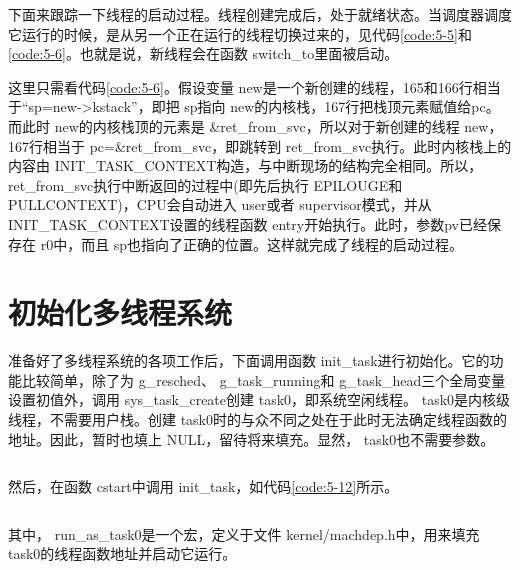 \documentclass[main.tex]{subfiles}
\begin{document}
\begin{CJK*}{UTF8}{song}
\par
下面来跟踪一下线程的启动过程。线程创建完成后，处于就绪状态。当调度器调度它运行的时候，是从另一个正在运行的线程切换过来的，见代码\ref{code:5-5}和\ref{code:5-6}。也就是说，新线程会在函数 switch\_\-to里面被启动。

\par
这里只需看代码\ref{code:5-6}。假设变量 new是一个新创建的线程，165和166行相当于“sp=new-\textgreater kstack”，即把 sp指向 new的内核栈，167行把栈顶元素赋值给pc。而此时 new的内核栈顶的元素是  \&ret\_\-from\_\-svc，所以对于新创建的线程 new，167行相当于 pc=\&ret\_\-from\_\-svc，即跳转到 ret\_\-from\_\-svc执行。此时内核栈上的内容由  INIT\_\-TASK\_\-CONTEXT构造，与中断现场的结构完全相同。所以，  ret\_\-from\_\-svc执行中断返回的过程中(即先后执行 EPILOUGE和  PULL\-CONTEXT)，CPU会自动进入 user或者 supervisor模式，并从  INIT\_\-TASK\_\-CONTEXT设置的线程函数  entry开始执行。此时，参数pv已经保存在 r0中，而且 sp也指向了正确的位置。这样就完成了线程的启动过程。

\section{初始化多线程系统}
准备好了多线程系统的各项工作后，下面调用函数 init\_\-task进行初始化。它的功能比较简单，除了为 g\_\-resched、 g\_\-task\_\-running和 g\_\-task\_\-head三个全局变量设置初值外，调用 sys\_\-task\_\-create创建 task0，即系统空闲线程。 task0是内核级线程，不需要用户栈。创建 task0时的与众不同之处在于此时无法确定线程函数的地址。因此，暂时也填上 NULL，留待将来填充。显然， task0也不需要参数。

\begin{code}
\label{code:5-11}
\inputminted[firstline=290,lastline=306,linenos,numbersep=5pt,frame=lines,framesep=2mm]{c}{src/chapter05/kernel/task.c}
\end{code}

\noindent
然后，在函数 cstart中调用 init\_\-task，如代码\ref{code:5-12}所示。

\begin{code}
\label{code:5-12}
\inputminted[firstline=491,lastline=502,linenos,numbersep=5pt,frame=lines,framesep=2mm]{c}{src/chapter05/kernel/machdep.c}
\end{code}

\noindent
其中， run\_\-as\_\-task0是一个宏，定义于文件 kernel\-/\-machdep.h中，用来填充 task0的线程函数地址并启动它运行。

\begin{code}
\label{code:5-13}
\inputminted[firstline=76,lastline=89,linenos,numbersep=5pt,frame=lines,framesep=2mm]{c}{src/chapter05/kernel/machdep.h}
\end{code}


\end{CJK*}
\end{document}
